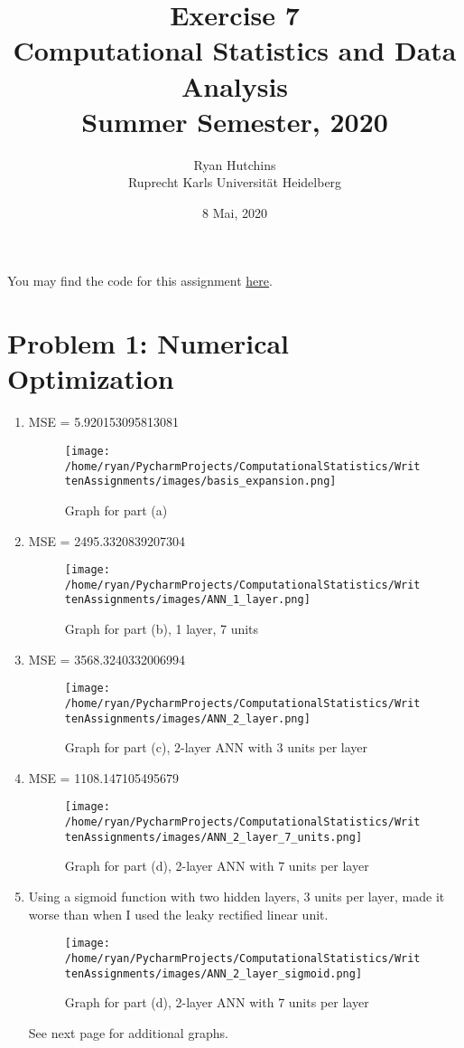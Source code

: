 \documentclass[a4paper,12pt]{article}
\title{
	Exercise 7  \\
	\large Computational Statistics and Data Analysis \\
	\large Summer Semester, 2020
	}
\author{Ryan Hutchins \\ 
Ruprecht Karls Universit\"at Heidelberg}
\date{8 Mai, 2020}
\begin{document}
\maketitle

You may find the code for this assignment \href{https://github.com/GoliathMarks/Computational_Statistics/blob/master/CompStatsHomeworkSeven/CompStatsHomeworkSeven.py}{here}.

\section{Problem 1: Numerical Optimization}
\begin{enumerate}
\item MSE = 5.920153095813081
 \begin{figure}[h!]
 \centering
  \texttt{[image: /home/ryan/PycharmProjects/ComputationalStatistics/WrittenAssignments/images/basis\_expansion.png]}
 \caption{Graph for part (a)}
 \end{figure}
 
 
\item MSE = 2495.3320839207304
 \begin{figure}[h!]
 \centering
  \texttt{[image: /home/ryan/PycharmProjects/ComputationalStatistics/WrittenAssignments/images/ANN\_1\_layer.png]}
 \caption{Graph for part (b), 1 layer, 7 units}
 \end{figure}


\item MSE = 3568.3240332006994
 \begin{figure}[h!]
 \centering
  \texttt{[image: /home/ryan/PycharmProjects/ComputationalStatistics/WrittenAssignments/images/ANN\_2\_layer.png]}
 \caption{Graph for part (c), 2-layer ANN with 3 units per layer}
 \end{figure}


\item MSE = 1108.147105495679
\begin{figure}[h!]
 \centering
  \texttt{[image: /home/ryan/PycharmProjects/ComputationalStatistics/WrittenAssignments/images/ANN\_2\_layer\_7\_units.png]}
 \caption{Graph for part (d), 2-layer ANN with 7 units per layer}
 \end{figure}


\item Using a sigmoid function with two hidden layers, 3 units per layer, made it worse than when I used the leaky rectified linear unit.
\begin{figure}[h!]
 \centering
  \texttt{[image: /home/ryan/PycharmProjects/ComputationalStatistics/WrittenAssignments/images/ANN\_2\_layer\_sigmoid.png]}
 \caption{Graph for part (d), 2-layer ANN with 7 units per layer}
 \end{figure}

See next page for additional graphs.
\end{enumerate}
\end{document}
